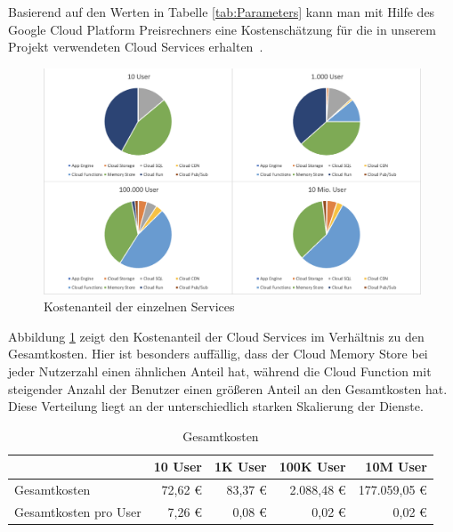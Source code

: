 \documentclass{article}
\begin{document}
Basierend auf den Werten in Tabelle \ref{tab:Parameters} kann man mit Hilfe des Google Cloud Platform Preisrechners eine Kostenschätzung für die in unserem Projekt verwendeten Cloud Services erhalten~\cite{google-pricing}.

\FloatBarrier

\begin{figure}[H]
\centering
\includegraphics[width=\textwidth]{images/pricingUsers}
\caption{Kostenanteil der einzelnen Services}
\label{fig:pricingUsers}
\end{figure}

Abbildung \ref{fig:pricingUsers} zeigt den Kostenanteil der Cloud Services im Verhältnis zu den Gesamtkosten. Hier ist besonders auffällig, dass der Cloud Memory Store bei jeder Nutzerzahl einen ähnlichen Anteil hat, während die Cloud Function mit steigender Anzahl der Benutzer einen größeren Anteil an den Gesamtkosten hat. Diese Verteilung liegt an der unterschiedlich starken Skalierung der Dienste.

\FloatBarrier
\begin{table}[hbt]
\centering
    \begin{tabular}{|l||r|r|r|r|}
    \hline
         & 10 User & 1K User & 100K User & 10M User \\ \hline\hline
        Gesamtkosten & 72,62 \euro{} & 83,37 \euro{} & 2.088,48 \euro{} & 177.059,05 \euro{} \\ \hline
        Gesamtkosten pro User & 7,26 \euro{} & 0,08 \euro{} & 0,02 \euro{} & 0,02 \euro{} \\ \hline
        
    \end{tabular}
\\ 
\caption{Gesamtkosten}
\label{tab:totalCost}
\end{table}
\end{document}
